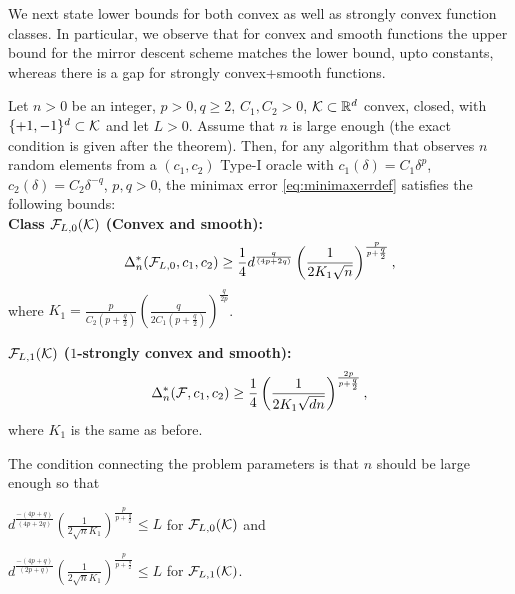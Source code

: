 We next state lower bounds for both convex as well as strongly convex function classes. In particular, we observe that for convex and smooth functions the upper bound for the mirror descent scheme matches the lower bound, upto constants, whereas there is a gap for strongly convex+smooth functions. 
\begin{theorem}
\label{thm:lb-convex}
Let $n>0$ be an integer, $p>0, q\ge 2$, $C_1,C_2>0$, 
$\mathcal{K}\subset \mathbb{R}^d$ convex, closed, with  $\{+1,-1\}^d\subset \mathcal{K}$ and let $L>0$.
Assume that $n$ is large enough (the exact condition is given after the theorem). 
Then, for any algorithm that observes $n$ random elements from a $(c_1,c_2)$ Type-I oracle 
 with $c_1(\delta) = C_1 \delta^p$, $c_2(\delta) = C_2 \delta^{-q}$, $p,q>0$,
 the minimax error \eqref{eq:minimaxerrdef} satisfies the following bounds:\\
\textbf{Class $\mathcal{F}_{L,0}(\mathcal{K})$ (Convex and smooth):}
\[
\Delta_n^{*}(\mathcal{F}_{L,0}, c_1,c_2) \ge \dfrac{1}{4}d^{\frac{q}{(4p+2q)}}\left(\dfrac{1}{2 K_1 \sqrt n}\right)^{\frac{p}{p+\frac{q}{2}}},
\]
where $K_1 = \frac{p}{C_2(p+\tfrac{q}{2})} \left(\frac{q}{2C_1(p+\tfrac{q}{2})}\right)^{\frac{q}{2p}}$.

\textbf{$\mathcal{F}_{L,1}(\mathcal{K})$ ($1$-strongly convex and smooth):}
\[
\Delta_n^{*}(\mathcal{F}, c_1,c_2) \ge \dfrac{1}{4}  \left(\dfrac{1}{2 K_1 \sqrt {d n}}\right)^{\frac{2p}{p+\frac{q}{2}}}, 
\]
where $K_1$ is the same as before.
\end{theorem}
The condition connecting the problem parameters is that $n$ should be large enough so that\\
\begin{inparaenum}[\bfseries (i)]
\item $d^{\frac{-(4p+q)}{(4p+2q)}}\left(\frac{1}{2\sqrt{n} K_1} \right)^{\frac{p}{p+\frac{q}{2}}}\le L$ for $\mathcal{F}_{L,0}(\mathcal{K})$ and\\
\item $d^{\frac{-(4p+q)}{(2p+q)}}\left(\frac{1}{2\sqrt{n} K_1} \right)^{\frac{p}{p+\frac{q}{2}}} \le L$ for $\mathcal{F}_{L,1}(\mathcal{K})$.
\end{inparaenum}
